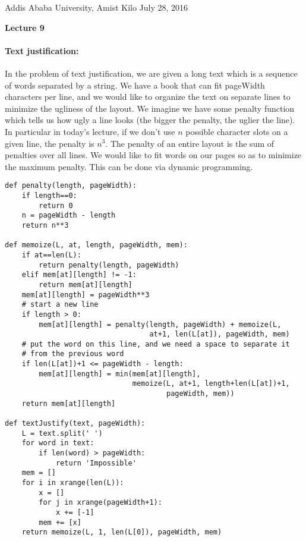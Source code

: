 \documentclass[11pt]{article}
\newlength{\toppush}
\newcommand{\htitle}[2]{\noindent\vspace*{-\toppush}\newline\parbox{6.5in}
 {\large Addis Ababa University, Amist Kilo \hfill #1\newline
\hspace*{\fill}{\bf Algorithms and Programming for High Schoolers} \hspace*{\fill} \newline
\mbox{}\hrulefill\mbox{}}\vspace*{1ex}\mbox{}\newline
\begin{center}{\Large\bf #2}\end{center}}
\begin{document}
\htitle{July 28, 2016}{Lecture 9}

\paragraph{\Large Text justification:}
In the problem of text justification, we are given a long text which
is a sequence of words separated by a string.  We have a book that can
fit pageWidth characters per line, and we would like to organize the
text on separate lines to minimize the ugliness of the layout.  We
imagine we have some penalty function which tells us how ugly a line
looks (the bigger the penalty, the uglier the line).  In particular in
today's lecture, if we don't use $n$ possible character slots on a given
line, the penalty is $n^3$. The penalty of an entire layout is the sum
of penalties over all lines.  We would like to fit words on our pages
so as to minimize the maximum penalty.  This can be done via dynamic
programming.

\begin{verbatim}
def penalty(length, pageWidth):
    if length==0:
        return 0
    n = pageWidth - length
    return n**3

def memoize(L, at, length, pageWidth, mem):
    if at==len(L):
        return penalty(length, pageWidth)
    elif mem[at][length] != -1:
        return mem[at][length]
    mem[at][length] = pageWidth**3
    # start a new line
    if length > 0:
        mem[at][length] = penalty(length, pageWidth) + memoize(L,
                                  at+1, len(L[at]), pageWidth, mem)
    # put the word on this line, and we need a space to separate it
    # from the previous word
    if len(L[at])+1 <= pageWidth - length:
        mem[at][length] = min(mem[at][length], 
                              memoize(L, at+1, length+len(L[at])+1,
                                      pageWidth, mem))
    return mem[at][length]

def textJustify(text, pageWidth):
    L = text.split(' ')
    for word in text:
        if len(word) > pageWidth:
            return 'Impossible'
    mem = []
    for i in xrange(len(L)):
        x = []
        for j in xrange(pageWidth+1):
            x += [-1]
        mem += [x]
    return memoize(L, 1, len(L[0]), pageWidth, mem)
\end{verbatim}
\end{document}
